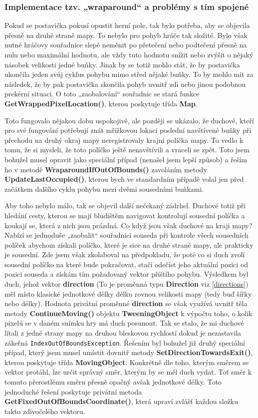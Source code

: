 \documentclass[a4]{article}
\begin{document}
\subsubsection{Implementace tzv. „wraparound“ a problémy s tím spojené} \label{wraparound}
Pokud se postavička pokusí opustit herní pole, tak bylo potřeba, aby se objevila přesně na druhé straně mapy. To nebylo pro pohyb hráče tak složité. Bylo však nutné hráčovy souřadnice slepě neměnit po přetečení nebo podtečení přesně na nulu nebo maximální hodnotu, ale vždy tuto hodnotu snížit nebo zvýšit o nějaký násobek velikosti jedné buňky. Jinak by se totiž mohlo stát, že by postavička ukončila jeden svůj cyklus pohybu mimo střed nějaké buňky. To by mohlo mít za následek, že by pak postavička skončila pohyb uvnitř zdi nebo jinou podobnou prekérní situaci. O toto „zaobalování“ souřadnic se stará funkce \textbf{GetWrappedPixelLocation()}, kterou poskytuje třída \textbf{Map}.

Toto fungovalo nějakou dobu uspokojivě, ale později se ukázalo, že duchové, kteří pro své fungování potřebují znát mřížkovou lokaci poslední navštívené buňky při přechodu na druhý okraj mapy neregistrovaly krajní políčka mapy. To vedlo k tomu, že si mysleli, že toto políčko ještě nenavštívili a vraceli se zpět. Toto jsem bohužel musel opravit jako speciální případ (nenašel jsem lepší způsob) a řeším ho v metodě \textbf{WraparoundIfOutOfBounds()} zavoláním metody \textbf{UpdateLastOccupied()}, kterou bych ve standardním případě volal jen před začátkem dalšího cyklu pohybu mezi dvěmi sousedními buňkami.

Aby toho nebylo málo, tak se objevil další nečekaný zádrhel. Duchové totiž při hledání cesty, kterou se mají bludištěm navigovat kontrolují sousední políčka a koukají se, která z nich jsou prázdná. Co když jsou však duchové na kraji mapy? Nabízí se jednoduše „zaobalit“ souřadnici souseda při kontrole všech sousedních políček abychom získali políčko, které je sice na druhé straně mapy, ale prakticky je sousední. Zde jsem však zkolaboval na předpokladu, že poté co si duch zvolí sousední políčko na které bude pokračovat, stačí odečíst jeho aktuální pozici od pozici souseda a získám tím požadovaný vektor příštího pohybu. Výsledkem byl duch, jehož vektor \textbf{direction} (To je proměnná typu \textbf{Direction} viz \ref{directions}) měl místo klasické jednotkové délky délku rovnou velikosti mapy (tedy buď šířky nebo délky). Hodnota privátní proměnné \textbf{direction} se však využívá uvnitř těla metody \textbf{ContinueMoving()} objektu \textbf{TweeningObject} k výpočtu toho, o kolik pixelů se v daném snímku hry má duch posunout. Tak se stalo, že mi duchové lítali z jedné strany mapy na druhou bleskovou rychlostí dokud je nezastavila zákeřná \verb|IndexOutOfBoundsException|. Řešením byl bohužel již druhý speciální případ, který jsem musel umístit dovnitř metody \textbf{SetDirectionTowardsExit()}, kterou poskytuje třída \textbf{MovingObject}. Konkrétně dle toho, kterým směrem se vektor protáhl, lze určit správný směr, kterým by se měl duch vydat. Toť směr k tomuto přerostlému směru přesně opačný avšak jednotkové délky. Toto jednoduché řešení poskytuje privátní metoda \textbf{GetFixedOutOfBoundsCoordinate()}, která upraví zvlášť každou složku takto zdivočelého vektoru.
\end{document}

